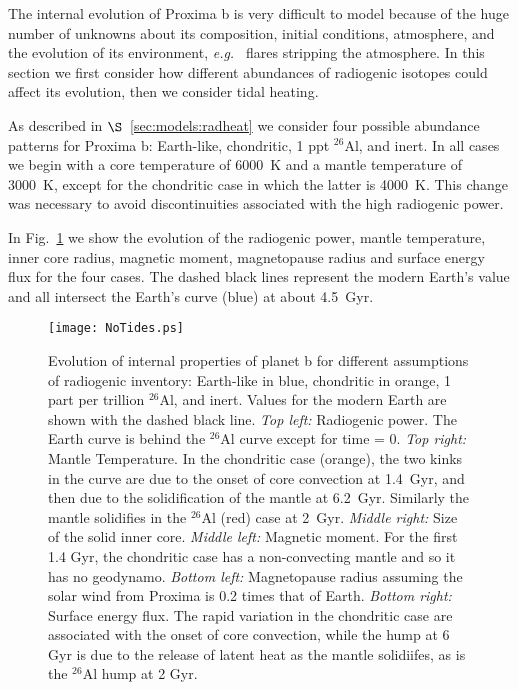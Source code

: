 \documentclass[preprint,12pt]{aastex}
\def\eg{{\it e.g.\ }}
\begin{document}
The internal evolution of Proxima b is very difficult to model because
of the huge number of unknowns about its composition, initial
conditions, atmosphere, and the evolution of its environment, \eg
flares stripping the atmosphere. In this section we first consider how
different abundances of radiogenic isotopes could affect its
evolution, then we consider tidal heating.




As described in $\S$~\ref{sec:models:radheat} we consider four
possible abundance patterns for Proxima b: Earth-like, chondritic, 1
ppt $^{26}$Al, and inert. In all cases we begin with a core
temperature of 6000~K and a mantle temperature of 3000~K, except for
the chondritic case in which the latter is 4000~K. This change
was necessary to avoid discontinuities associated with the high
radiogenic power.

In Fig.~\ref{fig:radiog} we show the evolution of the radiogenic
power, mantle temperature, inner core radius, magnetic moment,
magnetopause radius and surface energy flux for the four cases. The
dashed black lines represent the modern Earth's value and all
intersect the Earth's curve (blue) at about 4.5~Gyr.

\begin{figure} 
\begin{center}
\texttt{[image: NoTides.ps]}
\end{center}
\caption{Evolution of internal properties of planet b for different
  assumptions of radiogenic inventory: Earth-like in blue, chondritic
  in orange, 1 part per trillion $^{26}$Al, and inert. Values for the
  modern Earth are shown with the dashed black line. {\it Top left:}
  Radiogenic power. The Earth curve is behind the $^{26}$Al curve
  except for time = 0. {\it Top right:} Mantle Temperature. In the
  chondritic case (orange), the two kinks in the curve are due to the
  onset of core convection at 1.4~Gyr, and then due to the
  solidification of the mantle at 6.2~Gyr. Similarly the mantle
  solidifies in the $^{26}$Al (red) case at 2~Gyr. {\it Middle right:}
  Size of the solid inner core. {\it Middle left:} Magnetic
  moment. For the first 1.4 Gyr, the chondritic case has a
  non-convecting mantle and so it has no geodynamo. {\it Bottom left:}
  Magnetopause radius assuming the solar wind from Proxima is 0.2
  times that of Earth. {\it Bottom right:} Surface energy flux. The
  rapid variation in the chondritic case are associated with the onset
  of core convection, while the hump at 6 Gyr is due to the release of
  latent heat as the mantle solidiifes, as is the $^{26}$Al hump at 2
  Gyr.}
\label{fig:radiog}
\end{figure}
\end{document}
